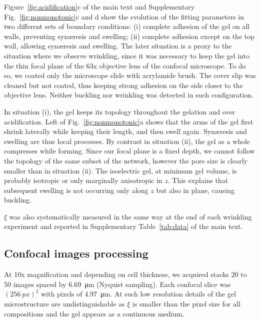 \documentclass[twocolumn,superscriptaddress,showpacs,preprintnumbers,
amsmath,amssymb,prl]{revtex4-1}
\begin{document}
Figure~\ref{fig:acidification}c of the main text and Supplementary Fig.~\ref{fig:nonmonotonic}c and d show the evolution of the fitting parameters in two different sets of boundary conditions: (i) complete adhesion of the gel on all walls, preventing syn\ae{}resis and swelling; (ii) complete adhesion except on the top wall, allowing syn\ae{}resis and swelling. The later situation is a proxy to the situation where we observe wrinkling, since it was necessary to keep the gel into the thin focal plane of the 63x objective lens of the confocal microscope. To do so, we coated only the microscope slide with acrylamide brush. The cover slip was cleaned but not coated, thus keeping strong adhesion on the side closer to the objective lens. Neither buckling nor wrinkling was detected in such configuration.

In situation (i), the gel keeps its topology throughout the gelation and over acidification. Left of Fig.~\ref{fig:nonmonotonic}a shows that the arms of the gel first shrink laterally while keeping their length, and then swell again. Syn\ae{}resis and swelling are thus local processes. By contrast in situation (ii), the gel as a whole compresses while forming. Since our focal plane is a fixed depth, we cannot follow the topology of the same subset of the network, however the pore size is clearly smaller than in situation (ii). The isoelectric gel, at minimum gel volume, is probably isotropic or only marginally anisotropic in $z$. This explains that subsequent swelling is not occurring only along $z$ but also in plane, causing buckling.

$\xi$ was also systematically measured in the same way at the end of each wrinkling experiment and reported in Supplementary Table~\ref{tab:data} of the main text. %



\subsection*{Confocal images processing}

At 10x magnification and depending on cell thickness, we acquired stacks 20 to 50 images spaced by \SI{6.69}{\micro\metre} (Nyquist sampling). Each confocal slice was $(\SI{256}{px})^2$ with pixels of \SI{4.97}{\micro\metre}. At such low resolution details of the gel microstructure are undistinguishable as $\xi$ is smaller than the pixel size for all compositions and the gel appears as a continuous medium.
\end{document}
